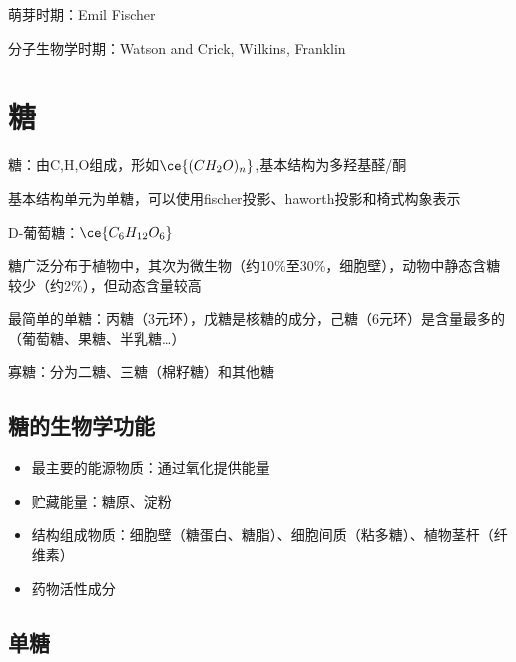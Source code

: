 \begin{notation}
    萌芽时期：Emil Fischer
\end{notation}
\begin{notation}
    分子生物学时期：Watson and Crick, Wilkins, Franklin
\end{notation}
\section{糖}%
\label{sec:糖}
\begin{defi}
    糖：由C,H,O组成，形如$\ce{( CH_2O )_{n}}$,基本结构为多羟基醛/酮
\end{defi}
基本结构单元为单糖，可以使用fischer投影、haworth投影和椅式构象表示
\begin{eg}
D-葡萄糖：$\ce{C_6H_{12}O_6}$
\end{eg}
糖广泛分布于植物中，其次为微生物（约10\%至30\%，细胞壁），动物中静态含糖较少（约2\%），但动态含量较高
\begin{notation}
    最简单的单糖：丙糖（3元环），戊糖是核糖的成分，己糖（6元环）是含量最多的（葡萄糖、果糖、半乳糖\ldots ）

    寡糖：分为二糖、三糖（棉籽糖）和其他糖
\end{notation}
\subsection{糖的生物学功能}%
\label{sub:糖的生物学功能}
\begin{itemize}
    \item 最主要的能源物质：通过氧化提供能量
    \item 贮藏能量：糖原、淀粉
    \item 结构组成物质：细胞壁（糖蛋白、糖脂）、细胞间质（粘多糖）、植物茎杆（纤维素）
    \item 药物活性成分
\end{itemize}
\subsection{单糖}%
\label{sub:单糖}


